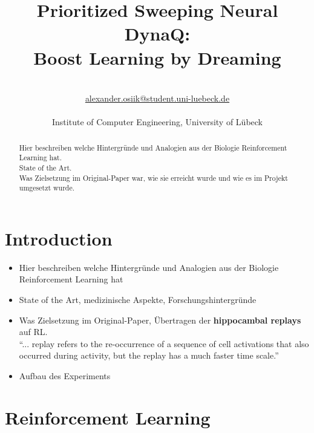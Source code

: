\documentclass[a4paper]{article}
\title{\textbf{Prioritized Sweeping Neural DynaQ:\\ Boost Learning by Dreaming}}\let\Title\@title
\author{\AuthorName\\
	\href{mailto:alexander.osiik@student.uni-luebeck.de}{alexander.osiik@student.uni-luebeck.de}\\
	\small \seminar\\
	\small Institute of Computer Engineering, University of L\"ubeck\\
}\let\Author\@author
\begin{document}
	\maketitle
	
	\begin{abstract}
		\noindent%
		Hier beschreiben welche Hintergründe und Analogien aus der Biologie Reinforcement Learning hat.\\
		State of the Art.\\
		Was Zielsetzung im Original-Paper war, wie sie erreicht wurde und wie es im Projekt umgesetzt wurde.
	\end{abstract}
	
	
	\section{Introduction}
	\label{sec:introduction}
	\begin{itemize}
		\item Hier beschreiben welche Hintergründe und Analogien aus der Biologie Reinforcement Learning hat
		\item State of the Art, medizinische Aspekte, Forschungshintergründe
		\item Was Zielsetzung im Original-Paper, Übertragen der \textbf{hippocambal replays} auf RL.\\
		``... replay refers to the re-occurrence of a sequence of cell activations that also occurred during activity, but the replay has a much faster time scale.''
		\item Aufbau des Experiments
	\end{itemize}


	\section{Reinforcement Learning}
\end{document}
